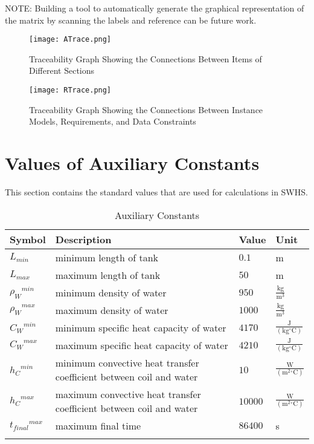 \documentclass[12pt]{article}
\begin{document}
NOTE: Building a tool to automatically generate the graphical representation of the matrix by scanning the labels and reference can be future work.
\begin{figure}
\begin{center}
\texttt{[image: ATrace.png]}
\caption{Traceability Graph Showing the Connections Between Items of Different Sections}
\label{Figure:TraceyA}
\end{center}
\end{figure}
\begin{figure}
\begin{center}
\texttt{[image: RTrace.png]}
\caption{Traceability Graph Showing the Connections Between Instance Models, Requirements, and Data Constraints}
\label{Figure:TraceyR}
\end{center}
\end{figure}
\section{Values of Auxiliary Constants}
\label{Sec:AuxConstants}
This section contains the standard values that are used for calculations in SWHS.
\begin{longtabu}{l X[l] l l}
\toprule
Symbol & Description & Value & Unit
\\
\midrule
${L_{min}}$ & minimum length of tank & $0.1$ & m
\\
${L_{max}}$ & maximum length of tank & $50$ & m
\\
${{ρ_{W}}^{min}}$ & minimum density of water & $950$ & $\frac{\text{kg}}{\text{m}^{3}}$
\\
${{ρ_{W}}^{max}}$ & maximum density of water & $1000$ & $\frac{\text{kg}}{\text{m}^{3}}$
\\
${{C_{W}}^{min}}$ & minimum specific heat capacity of water & $4170$ & $\frac{\text{J}}{(\text{kg}{}^{\circ}\text{C})}$
\\
${{C_{W}}^{max}}$ & maximum specific heat capacity of water & $4210$ & $\frac{\text{J}}{(\text{kg}{}^{\circ}\text{C})}$
\\
${{h_{C}}^{min}}$ & minimum convective heat transfer coefficient between coil and water & $10$ & $\frac{\text{W}}{(\text{m}^{2}{}^{\circ}\text{C})}$
\\
${{h_{C}}^{max}}$ & maximum convective heat transfer coefficient between coil and water & $10000$ & $\frac{\text{W}}{(\text{m}^{2}{}^{\circ}\text{C})}$
\\
${{t_{final}}^{max}}$ & maximum final time & $86400$ & s
\\
\bottomrule
\caption{Auxiliary Constants}
\label{Table:TAuxConsts}
\end{longtabu}
\end{document}
